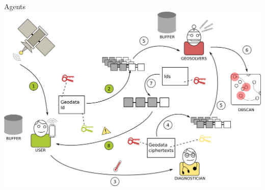 \begin{frame}{Agents}
    \centering
    \includegraphics[width=0.95\linewidth]{images/design_agents.png}
\end{frame}

